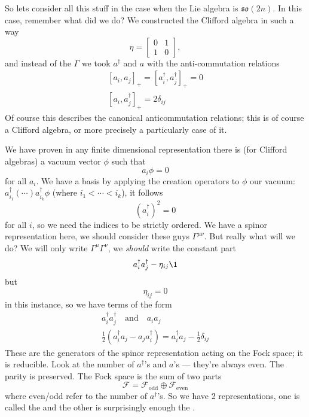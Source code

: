 So lets consider all this stuff in the case when the Lie algebra
is $\mathfrak{so}(2n)$. In this case, remember what did we do? We
constructed the Clifford algebra in such a way
\begin{equation}
\eta = \begin{bmatrix} 0 & 1\\ 1& 0
\end{bmatrix},
\end{equation}
and instead of the $\Gamma$ we took $a^{\dagger}$ and $a$ with
the anti-commutation relations
\begin{subequations}
\begin{align}
[a_{i},a_{j}]_{+} = [a^{\dagger}_{i},a^{\dagger}_{j}]_{+} = 0\\
[a_{i}, a^{\dagger}_{j}]_{+} = 2\delta_{ij}
\end{align}
\end{subequations}
Of course this describes the canonical anticommutation relations;
this is of course a Clifford algebra, or more precisely a
particularly case of it.

We have proven in any finite dimensional representation there is
(for Clifford algebras) a vacuum vector $\phi$ such that
\begin{equation}
a_{i}\phi = 0
\end{equation}
for all $a_{i}$. We have a basis by applying the creation
operators to $\phi$ our vacuum:
$a^{\dagger}_{i_{1}}(\cdots)a^{\dagger}_{i_{k}}\phi$ (where
$i_{1}<\cdots<i_{k}$), it follows
\begin{equation}
(a^{\dagger}_{i})^{2}=0
\end{equation}
for all $i$, so we need the indices to be strictly ordered. We
have a spinor representation here, we should consider these guys
$\Gamma^{\mu\nu}$. But really what will we do? We will only write
$\Gamma^{\mu}\Gamma^{\nu}$, we \emph{should} write the constant
part
\begin{equation}
a^{\dagger}_{i}a^{\dagger}_{j}-\eta_{ij}\1
\end{equation}
but 
\begin{equation}
\eta_{ij}=0
\end{equation}
in this instance, so we have terms of the form
\begin{subequations}
\begin{align}
a^{\dagger}_{i}a^{\dagger}_{j}\quad\mbox{and}\quad a_{i}a_{j}\\
\frac{1}{2}(a^{\dagger}_{i}a_{j}-a_{j}a^{\dagger}_{i})=a^{\dagger}_{i}a_{j}-\frac{1}{2}\delta_{ij}
\end{align}
\end{subequations}
These are the generators of the spinor representation acting on
the Fock space; it is reducible. Look at the number of
$a^{\dagger}$'s and $a$'s --- they're always even. The parity is
preserved. The Fock space is the sum of two parts
\begin{equation}
\mathcal{F}=\mathcal{F}_{\text{odd}}\oplus\mathcal{F}_{\text{even}}
\end{equation}
where even/odd refer to the number of $a^{\dagger}$'s. So we have
2 representations, one is called the  and the other is surprisingly enough the
. 

